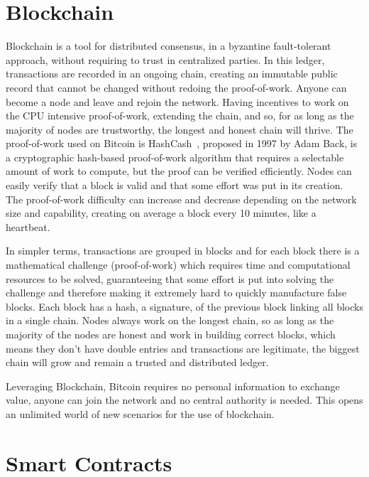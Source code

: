 \section{Blockchain}

Blockchain is a tool for distributed consensus, in a byzantine fault-tolerant approach, without requiring to trust in centralized parties. In this ledger, transactions are recorded in an ongoing chain, creating an immutable public record that cannot be changed without redoing the proof-of-work. Anyone can become a node and leave and rejoin the network. Having incentives to work on the CPU intensive proof-of-work, extending the chain, and so, for as long as the majority of nodes are trustworthy, the longest and honest chain will thrive. The proof-of-work used on Bitcoin is HashCash~\citet{Back2002}, proposed in 1997 by Adam Back, is a cryptographic hash-based proof-of-work algorithm that requires a selectable amount of work to compute, but the proof can be verified efficiently. Nodes can easily verify that a block is valid and that some effort was put in its creation. The proof-of-work difficulty can increase and decrease depending on the network size and capability, creating on average a block every 10 minutes, like a heartbeat.

In simpler terms, transactions are grouped in blocks and for each block there is a mathematical challenge (proof-of-work) which requires time and computational resources to be solved, guaranteeing that some effort is put into solving the challenge and therefore making it extremely hard to quickly manufacture false blocks. Each block has a hash, a signature, of the previous block linking all blocks in a single chain. Nodes always work on the longest chain, so as long as the majority of the nodes are honest and work in building correct blocks, which means they don't have double entries and transactions are legitimate, the biggest chain will grow and remain a trusted and distributed ledger.

Leveraging Blockchain, Bitcoin requires no personal information to exchange value, anyone can join the network and no central authority is needed. This opens an unlimited world of new scenarios for the use of blockchain.



\section{Smart Contracts}


